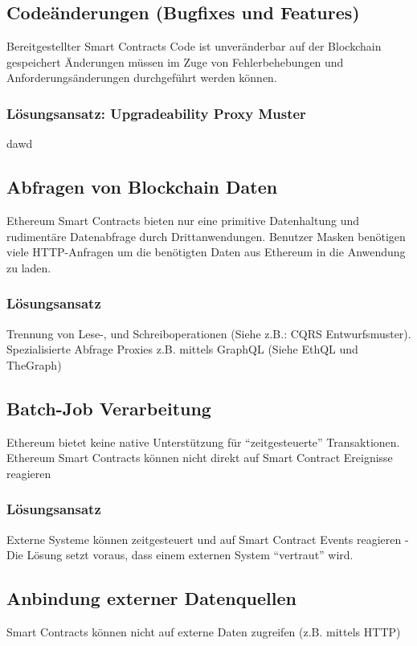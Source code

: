 \subsection*{Codeänderungen (Bugfixes und Features)}
Bereitgestellter Smart Contracts Code ist unveränderbar auf der Blockchain gespeichert
Änderungen müssen im Zuge von Fehlerbehebungen und Anforderungsänderungen durchgeführt werden können.

\subsubsection*{Lösungsansatz: Upgradeability Proxy Muster}
dawd

\subsection*{Abfragen von Blockchain Daten}
Ethereum Smart Contracts bieten nur eine primitive Datenhaltung und rudimentäre Datenabfrage durch Drittanwendungen. 
Benutzer Masken benötigen viele HTTP-Anfragen um die benötigten Daten aus Ethereum in die Anwendung zu laden.

\subsubsection*{Lösungsansatz}
Trennung von Lese-, und Schreiboperationen (Siehe z.B.: CQRS Entwurfsmuster). Spezialisierte Abfrage Proxies z.B. mittels GraphQL (Siehe EthQL und TheGraph)


\subsection*{Batch-Job Verarbeitung}
Ethereum bietet keine native Unterstützung für “zeitgesteuerte” Transaktionen.
Ethereum Smart Contracts können nicht direkt auf Smart Contract Ereignisse reagieren

\subsubsection*{Lösungsansatz}
Externe Systeme können zeitgesteuert und auf Smart Contract Events reagieren - Die Lösung setzt voraus, dass einem externen System “vertraut” wird.


\subsection*{Anbindung externer Datenquellen}
Smart Contracts können nicht auf externe Daten zugreifen (z.B. mittels HTTP)

